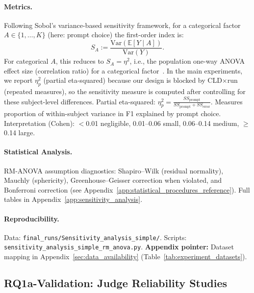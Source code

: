 \paragraph{Metrics.}
Following Sobol's variance-based sensitivity framework, for a categorical factor $A\in\{1,\dots,K\}$ (here: prompt choice) the first-order index is:
\begin{equation}
S_A := \frac{\mathrm{Var}(\mathbb{E}[Y \mid A])}{\mathrm{Var}(Y)}.
\end{equation}
For categorical $A$, this reduces to $S_A=\eta^2$,
i.e., the population one-way ANOVA effect size (correlation ratio) for a categorical factor~\cite{saltelli2010variance}. In the main
experiments, we report $\eta^2_p$ (partial eta-squared) because our design is blocked by CLD$\times$run (repeated
measures), so the sensitivity measure is computed after controlling for these subject-level differences.
Partial eta-squared: $\eta^2_p = \frac{SS_{\text{prompt}}}{SS_{\text{prompt}} + SS_{\text{error}}}$. Measures proportion of within-subject variance in F1 explained by prompt choice. Interpretation (Cohen): $<$0.01 negligible, 0.01--0.06 small, 0.06--0.14 medium, $\geq$0.14 large.

\paragraph{Statistical Analysis.}
RM-ANOVA assumption diagnostics: Shapiro--Wilk (residual normality), Mauchly (sphericity), Greenhouse--Geisser correction when violated, and Bonferroni correction (see Appendix~\ref{app:statistical_procedures_reference}). Full tables in Appendix~\ref{app:sensitivity_analysis}.

\paragraph{Reproducibility.}
Data: \texttt{final\_runs/Sensitivity\_analysis\_simple/}. Scripts: \texttt{sensitivity\_analysis\_simple\_rm\_anova.py}.
\textbf{Appendix pointer:} Dataset mapping in Appendix~\ref{sec:data_availability} (Table~\ref{tab:experiment_datasets}).

\subsection{RQ1a-Validation: Judge Reliability Studies}
\label{sec:rq1a_validation_studies}

